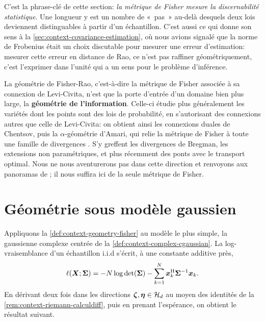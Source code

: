 \begin{remark}
  C'est la phrase-clé de cette section: \emph{la métrique de Fisher mesure la discernabilité statistique}. Une longueur y est un nombre de «~pas~» au-delà desquels deux lois deviennent distinguables à partir d'un échantillon. C'est aussi ce qui donne son sens à la \cref{sec:context-covariance-estimation}, où nous avions signalé que la norme de Frobenius était un choix discutable pour mesurer une erreur d'estimation: mesurer cette erreur en distance de Rao, ce n'est pas raffiner géométriquement, c'est l'exprimer dans l'unité qui a un sens pour le problème d'inférence.
\end{remark}

\begin{remark}
\label{rem:context-geometry-ouverture}
  La géométrie de Fisher-Rao, c'est-à-dire la métrique de Fisher associée à sa connexion de Levi-Civita, n'est que la porte d'entrée d'un domaine bien plus large, la \textbf{géométrie de l'information}. Celle-ci étudie plus généralement les variétés dont les points sont des lois de probabilité, en s'autorisant des connexions autres que celle de Levi-Civita: on obtient ainsi les connexions duales de Chentsov, puis la $\alpha$-géométrie d'Amari, qui relie la métrique de Fisher à toute une famille de divergences . S'y greffent les divergences de Bregman, les extensions non paramétriques, et plus récemment des ponts avec le transport optimal. Nous ne nous aventurerons pas dans cette direction et renvoyons aux panoramas de ; il nous suffira ici de la seule métrique de Fisher.
\end{remark}


\section{Géométrie sous modèle gaussien}
\label{sec:context-geometry-gaussian}

Appliquons la \cref{def:context-geometry-fisher} au modèle le plus simple, la gaussienne complexe centrée de la \cref{def:context-complex-cgaussian}. La log-vraisemblance d'un échantillon i.i.d s'écrit, à une constante additive près,
\begin{equation}
  \ell(\boldsymbol{X};\boldsymbol{\Sigma})
  =
  -N\log\operatorname{\operatorname{det}}(\boldsymbol{\Sigma})
  -\sum_{k=1}^{N}\boldsymbol{x}_k^{\mathrm{H}} {\boldsymbol{\Sigma}}^{-1} \boldsymbol{x}_k.
  \label{eq:context-geometry-vraisemblancegauss}
\end{equation}
En dérivant deux fois dans les directions $\boldsymbol{\zeta},\boldsymbol{\eta}\in\mathcal{H}_{d}$ au moyen des identités de la \cref{rem:context-riemann-calculdiff}, puis en prenant l'espérance, on obtient le résultat suivant.

